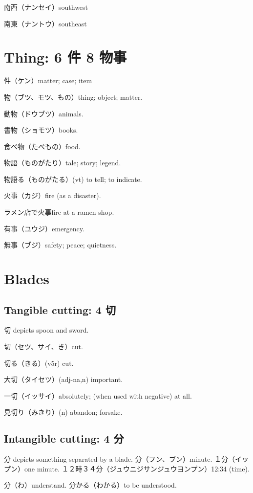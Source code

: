 南西（ナンセイ）southwest

南東（ナントウ）southeast

\section{Thing: 6 件 8 物事}

件（ケン）matter; case; item

物（ブツ、モツ、もの）thing; object; matter.

動物（ドウブツ）animals.

書物（ショモツ）books.

食べ物（たべもの）food.

物語（ものがたり）tale; story; legend.

物語る（ものがたる）(vt) to tell; to indicate.

火事（カジ）fire (as a disaster).

ラメン店で火事fire at a ramen shop.

有事（ユウジ）emergency.

無事（ブジ）safety; peace; quietness.

\section{Blades}

\subsection{Tangible cutting: 4 切}

切 depicts spoon and sword.

切（セツ、サイ、き）cut.

切る（きる）(v5r) cut.

大切（タイセツ）(adj-na,n) important.

一切（イッサイ）absolutely; (when used with negative) at all.

見切り（みきり）(n) abandon; forsake.

\subsection{Intangible cutting: 4 分}

分 depicts something separated by a blade.
分（フン、ブン）minute.
１分（イップン）one minute.
１２時３４分（ジュウニジサンジュウヨンプン）12:34 (time).

分（わ）understand.
分かる（わかる）to be understood.

